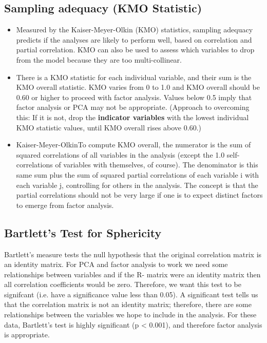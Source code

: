 \documentclass[a4paper,12pt]{article}
\begin{document}
\subsection{Sampling adequacy (KMO Statistic)}
\begin{itemize}
\item Measured by the Kaiser-Meyer-Olkin (KMO) statistics, sampling adequacy predicts if the analyses are likely to perform well, based on correlation and partial correlation. KMO can also be used to assess which variables to drop from the model because they are too multi-collinear.

\item There is a KMO statistic for each individual variable, and their sum is the KMO overall statistic. KMO varies from 0 to 1.0 and KMO overall should be 0.60 or higher to proceed with factor analysis. Values below 0.5 imply that factor analysis or PCA may not be appropriate. (Approach to overcoming this: If it is not, drop the \textbf{indicator variables} with the lowest individual KMO statistic values, until KMO overall rises above 0.60.)

\item Kaiser-Meyer-OlkinTo compute KMO overall, the numerator is the sum of squared correlations of all variables in the analysis (except the 1.0 self-correlations of variables with themselves, of course). The denominator is this same sum plus the sum of squared partial correlations of each variable i with each variable j, controlling for others in the analysis. The concept is that the partial correlations should not be very large if one is to expect distinct factors to emerge from factor analysis.
\end{itemize}
\subsection{Bartlett's Test for Sphericity}
Bartlett's measure tests the null hypothesis that the original correlation matrix is an identity
matrix. For PCA and factor analysis to work we need some relationships between variables and if the R-
matrix were an identity matrix then all correlation coefficients would be zero. Therefore, we
want this test to be signifcant (i.e. have a significance value less than 0.05). A significant test
tells us that the correlation matrix is not an identity matrix; therefore, there are some relationships
between the variables we hope to include in the analysis. For these data, Bartlett's test is
highly significant (p < 0.001), and therefore factor analysis is appropriate.

\end{document}
